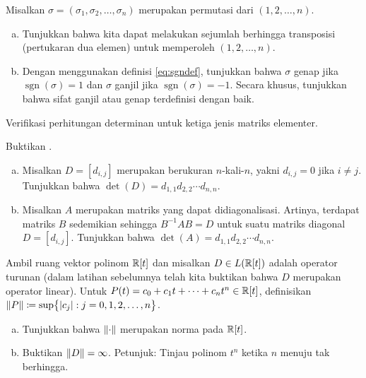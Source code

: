 \begin{exercise}
Misalkan $\sigma = (\sigma_1,\sigma_2,\ldots,\sigma_n)$ merupakan permutasi dari
$(1,2,\ldots,n)$.
\begin{enumerate}[a)]
\item
Tunjukkan bahwa kita dapat melakukan sejumlah berhingga transposisi (pertukaran dua
elemen) untuk memperoleh $(1,2,\ldots,n)$.
\item
Dengan menggunakan definisi \eqref{eq:sgndef},
tunjukkan bahwa $\sigma$ genap jika $\operatorname{sgn}(\sigma) = 1$ dan $\sigma$
ganjil jika $\operatorname{sgn}(\sigma) = -1$.  Secara khusus, tunjukkan bahwa
sifat ganjil atau genap terdefinisi dengan baik.
\end{enumerate}
\end{exercise}

\begin{exercise}
Verifikasi perhitungan determinan untuk ketiga jenis 
matriks elementer.
\end{exercise}

\begin{exercise}
Buktikan .
\end{exercise}

\begin{exercise}
\leavevmode
\begin{enumerate}[a)]
\item
Misalkan $D = [d_{i,j}]$ merupakan \emph{} berukuran $n$-kali-$n$, yakni $d_{i,j} = 0$ jika $i
\neq j$.  Tunjukkan bahwa $\det(D) = d_{1,1}d_{2,2} \cdots d_{n,n}$.
\item
Misalkan $A$ merupakan matriks yang dapat didiagonalisasi.  Artinya, terdapat matriks
$B$ sedemikian sehingga $B^{-1}AB = D$ untuk suatu matriks diagonal $D = [d_{i,j}]$.  Tunjukkan
bahwa $\det(A) = d_{1,1}d_{2,2} \cdots d_{n,n}$.
\end{enumerate}
\end{exercise}

\begin{exercise}
\pagebreak[1]
Ambil ruang vektor polinom ${\mathbb{R}}[t]$ dan misalkan $D \in L({\mathbb{R}}[t])$ adalah
operator turunan (dalam latihan sebelumnya telah kita buktikan bahwa $D$ merupakan operator
linear).  Untuk $P(t) = c_0 + c_1 t + \cdots + c_n
t^n \in {\mathbb{R}}[t]$, definisikan $\lVert {P} \rVert \coloneqq \sup \bigl\{ \lvert {c_j} \rvert : j = 0,1,2,\ldots,n \bigr\}$.
\begin{enumerate}[a)]
\item
Tunjukkan bahwa $\lVert {\cdot} \rVert$ merupakan norma pada ${\mathbb{R}}[t]$.
\item
Buktikan $\lVert {D} \rVert = \infty$.  Petunjuk: Tinjau polinom $t^n$ ketika $n$ menuju tak berhingga.
\end{enumerate}
\end{exercise}

